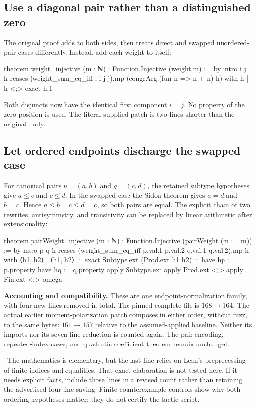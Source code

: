 \subsection{Use a diagonal pair rather than a distinguished zero}
The original proof adds  to both sides, then treats direct and swapped unordered-pair cases differently. Instead, add each weight to itself:
\begin{Lean}
theorem weight_injective (m : ℕ) : Function.Injective (weight m) := by
  intro i j h
  rcases (weight_sum_eq_iff i i j j).mp
    (congrArg (fun n => n + n) h) with h | h <;>
    exact h.1
\end{Lean}
Both disjuncts now have the identical first component $i=j$. No property of the zero position is used. The literal supplied patch is two lines shorter than the original body.

\subsection{Let ordered endpoints discharge the swapped case}
For canonical pairs $p=(a,b)$ and $q=(c,d)$, the retained subtype hypotheses give $a\le b$ and $c\le d$. In the swapped case the Sidon theorem gives $a=d$ and $b=c$. Hence $a\le b=c\le d=a$, so both pairs are equal. The explicit chain of two rewrites, antisymmetry, and transitivity can be replaced by linear arithmetic after extensionality:
\begin{Lean}
theorem pairWeight_injective (m : ℕ) :
    Function.Injective (pairWeight (m := m)) := by
  intro p q h
  rcases (weight_sum_eq_iff p.val.1 p.val.2 q.val.1 q.val.2).mp h with
    ⟨h1, h2⟩ | ⟨h1, h2⟩
  · exact Subtype.ext (Prod.ext h1 h2)
  · have hp := p.property
    have hq := q.property
    apply Subtype.ext
    apply Prod.ext <;> apply Fin.ext <;> omega
\end{Lean}

\textbf{Accounting and compatibility.} These are one endpoint-normalization family, with four new lines removed in total. The pinned complete file is $168\to164$. The actual earlier moment-polarization patch composes in either order, without fuzz, to the same bytes: $161\to157$ relative to the assumed-applied baseline. Neither its imports nor its seven-line reduction is counted again. The pair encoding, repeated-index cases, and quadratic coefficient theorem remain unchanged.

\risk\ The mathematics is elementary, but the last line relies on Lean's  preprocessing of finite indices and equalities. That exact elaboration is not tested here. If it needs explicit  facts, include those lines in a revised count rather than retaining the advertised four-line saving. Finite counterexample controls show why both ordering hypotheses matter; they do not certify the tactic script.

